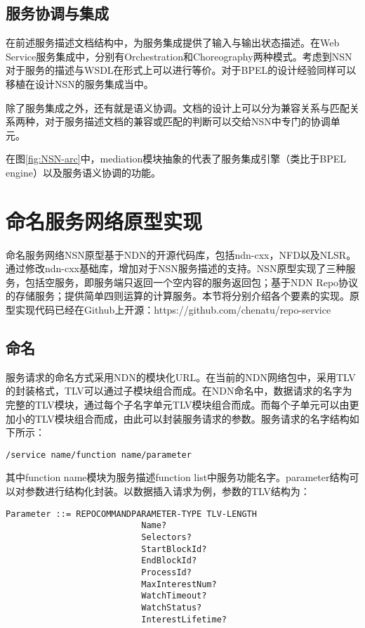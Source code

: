 \subsection{服务协调与集成}
在前述服务描述文档结构中，为服务集成提供了输入与输出状态描述。在Web Service服务集成中，分别有Orchestration和Choreography两种模式。考虑到NSN对于服务的描述与WSDL在形式上可以进行等价。对于BPEL的设计经验同样可以移植在设计NSN的服务集成当中。

除了服务集成之外，还有就是语义协调。文档的设计上可以分为兼容关系与匹配关系两种，对于服务描述文档的兼容或匹配的判断可以交给NSN中专门的协调单元。

在图\ref{fig:NSN-arc}中，mediation模块抽象的代表了服务集成引擎（类比于BPEL engine）以及服务语义协调的功能。

\section{命名服务网络原型实现}
命名服务网络NSN原型基于NDN的开源代码库，包括ndn-cxx，NFD以及NLSR。通过修改ndn-cxx基础库，增加对于NSN服务描述的支持。NSN原型实现了三种服务，包括空服务，即服务端只返回一个空内容的服务返回包；基于NDN Repo协议的存储服务；提供简单四则运算的计算服务。本节将分别介绍各个要素的实现。原型实现代码已经在Github上开源：https://github.com/chenatu/repo-service

\subsection{命名}
服务请求的命名方式采用NDN的模块化URL。在当前的NDN网络包中，采用TLV的封装格式，TLV可以通过子模块组合而成。在NDN命名中，数据请求的名字为完整的TLV模块，通过每个子名字单元TLV模块组合而成。而每个子单元可以由更加小的TLV模块组合而成，由此可以封装服务请求的参数。服务请求的名字结构如下所示：
\begin{framed}
\begin{verbatim}
/service name/function name/parameter
\end{verbatim}
\end{framed}
其中function name模块为服务描述function list中服务功能名字。parameter结构可以对参数进行结构化封装。以数据插入请求为例，参数的TLV结构为：
\begin{framed}
\begin{verbatim}
Parameter ::= REPOCOMMANDPARAMETER-TYPE TLV-LENGTH
                           Name?
                           Selectors?
                           StartBlockId?
                           EndBlockId?
                           ProcessId?
                           MaxInterestNum?
                           WatchTimeout?
                           WatchStatus?
                           InterestLifetime?
\end{verbatim}
\end{framed}

